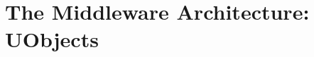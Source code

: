 \part[The Middleware Architecture: UObjects]
     {The Middleware Architecture:\\UObjects}
\label{part:uobject}


%





